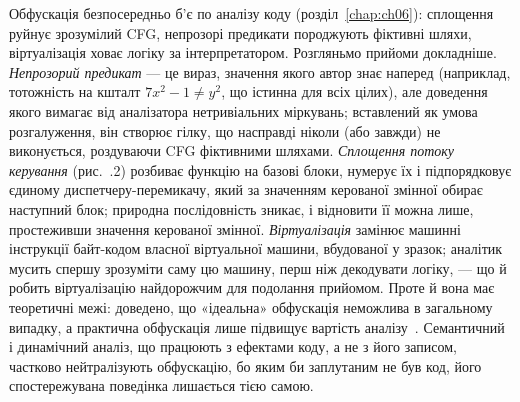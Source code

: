 \begin{tikzfig}
\end{tikzfig}

Обфускація безпосередньо б'є по аналізу коду (розділ~\ref{chap:ch06}): сплощення руйнує зрозумілий CFG, непрозорі предикати породжують фіктивні шляхи, віртуалізація ховає логіку за інтерпретатором. Розгляньмо прийоми докладніше. \emph{Непрозорий предикат} --- це вираз, значення якого автор знає наперед (наприклад, тотожність на кшталт $7x^2 - 1 \ne y^2$, що істинна для всіх цілих), але доведення якого вимагає від аналізатора нетривіальних міркувань; вставлений як умова розгалуження, він створює гілку, що насправді ніколи (або завжди) не виконується, роздуваючи CFG фіктивними шляхами. \emph{Сплощення потоку керування} (рис.~\thechapter.2) розбиває функцію на базові блоки, нумерує їх і підпорядковує єдиному диспетчеру-перемикачу, який за значенням керованої змінної обирає наступний блок; природна послідовність зникає, і відновити її можна лише, простеживши значення керованої змінної. \emph{Віртуалізація} замінює машинні інструкції байт-кодом власної віртуальної машини, вбудованої у зразок; аналітик мусить спершу зрозуміти саму цю машину, перш ніж декодувати логіку, --- що й робить віртуалізацію найдорожчим для подолання прийомом. Проте й вона має теоретичні межі: доведено, що «ідеальна» обфускація неможлива в загальному випадку, а практична обфускація лише підвищує вартість аналізу~\cite{ch08:oreans}. Семантичний і динамічний аналіз, що працюють з ефектами коду, а не з його записом, частково нейтралізують обфускацію, бо яким би заплутаним не був код, його спостережувана поведінка лишається тією самою.


